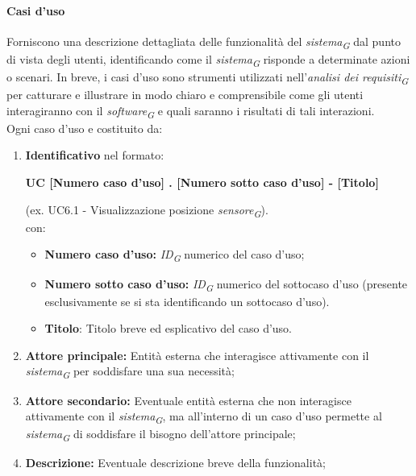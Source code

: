 \paragraph{Casi d'uso}
Forniscono una descrizione dettagliata delle funzionalità del \textit{sistema}\textsubscript{\textit{G}} dal punto di vista degli utenti, identificando come il \textit{sistema}\textsubscript{\textit{G}} risponde a determinate azioni o scenari. In breve, i casi d'uso sono strumenti utilizzati nell'\textit{analisi dei requisiti}\textsubscript{\textit{G}} per catturare e illustrare in modo chiaro e comprensibile come gli utenti interagiranno con il \textit{software}\textsubscript{\textit{G}} e quali saranno i risultati di tali interazioni. \\
Ogni caso d'uso e costituito da:
\begin{enumerate}
    \item \textbf{Identificativo} nel formato:\\
          \begin{center}
              \textbf{UC [Numero caso d'uso] . [Numero sotto caso d'uso] - [Titolo]}
          \end{center}
          (ex. UC6.1 - Visualizzazione posizione \textit{sensore}\textsubscript{\textit{G}}).\\
          con:
          \begin{itemize}
              \item \textbf{Numero caso d'uso:} \textit{ID}\textsubscript{\textit{G}} numerico del caso d'uso;
              \item \textbf{Numero sotto caso d'uso:} \textit{ID}\textsubscript{\textit{G}} numerico del sottocaso d'uso (presente esclusivamente se si sta identificando un sottocaso d'uso).
              \item \textbf{Titolo}: Titolo breve ed esplicativo del caso d'uso.
          \end{itemize}
    \item \textbf{Attore principale:} Entità esterna che interagisce attivamente con il \textit{sistema}\textsubscript{\textit{G}} per soddisfare una sua necessità;
    \item \textbf{Attore secondario:} Eventuale entità esterna che non interagisce attivamente con il \textit{sistema}\textsubscript{\textit{G}}, ma all'interno di un caso d'uso permette al \textit{sistema}\textsubscript{\textit{G}} di soddisfare il bisogno dell'attore principale;
    \item \textbf{Descrizione:} Eventuale descrizione breve della funzionalità;

\end{enumerate}
